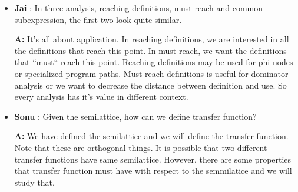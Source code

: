 \begin{itemize}
    \item \textbf{Jai} : In three analysis, reaching definitions, must reach and common subexpression, the first two look quite similar.
                    
            \textbf{A:} It's all about application. In reaching definitions, we are interested in all the definitions that reach this point. In must reach, we want the definitions that ``must`` reach this point. Reaching definitions may be used for phi nodes or specialized program paths. Must reach definitions is useful for dominator analysis or we want to decrease the distance between definition and use. So every analysis has it's value in different context.

    \item \textbf{Sonu} : Given the semilattice, how can we define transfer function?
                    
            \textbf{A:} We have defined the semilattice and we will define the transfer function. Note that these are orthogonal things. It is possible that two different transfer functions have same semilattice. However, there are some properties that transfer function must have with respect to the semmilatice and we will study that.
\end{itemize}
\clearpage